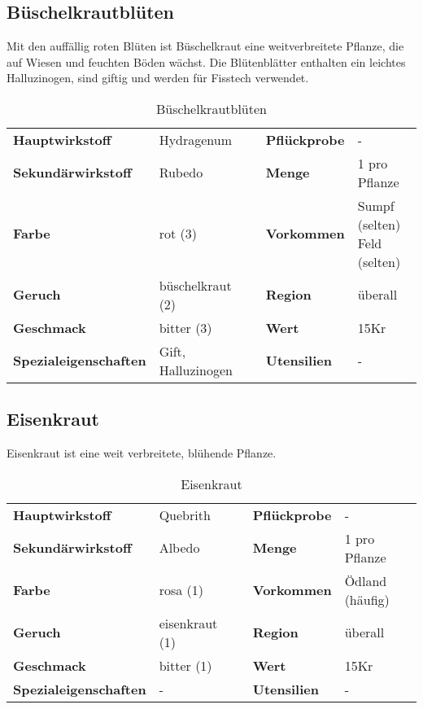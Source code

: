 \subsection{Büschelkrautblüten}
Mit den auffällig roten Blüten ist Büschelkraut eine weitverbreitete Pflanze, die auf Wiesen und feuchten Böden wächst. Die Blütenblätter enthalten ein leichtes Halluzinogen, sind giftig und werden für Fisstech verwendet. 

\begin{table}[H] 
\begin{center} 
\begin{tabular}{|l|l|p{1cm}|l|l|} 
  	\cline{1-2} \cline{4-5} 
  	\textbf{Hauptwirkstoff} & Hydragenum && \textbf{Pflückprobe} & - \\ \cline{1-2} \cline{4-5} 
  	\textbf{Sekundärwirkstoff} & Rubedo && \textbf{Menge} & 1 pro Pflanze \\ \cline{1-2} \cline{4-5} 
  	\textbf{Farbe} & rot (3) && \textbf{Vorkommen} & \brcell{Sumpf (selten)\\Feld (selten)} \\ \cline{1-2} \cline{4-5} 
  	\textbf{Geruch} & büschelkraut (2) && \textbf{Region} & überall \\ \cline{1-2} \cline{4-5} 
  	\textbf{Geschmack} & bitter (3) && \textbf{Wert} & 15Kr \\ \cline{1-2} \cline{4-5} 
  	\textbf{Spezialeigenschaften} & Gift, Halluzinogen && \textbf{Utensilien} & - \\ \cline{1-2} \cline{4-5} 
\end{tabular} 
\end{center} 
\caption{Büschelkrautblüten} 
\label{tab:bueschelkrautblueten} 
\end{table}


\subsection{Eisenkraut}
Eisenkraut ist eine weit verbreitete, blühende Pflanze. 

\begin{table}[H] 
\begin{center} 
\begin{tabular}{|l|l|p{1cm}|l|l|} 
  	\cline{1-2} \cline{4-5} 
  	\textbf{Hauptwirkstoff} & Quebrith && \textbf{Pflückprobe} & - \\ \cline{1-2} \cline{4-5} 
  	\textbf{Sekundärwirkstoff} & Albedo && \textbf{Menge} & 1 pro Pflanze \\ \cline{1-2} \cline{4-5} 
  	\textbf{Farbe} & rosa (1) && \textbf{Vorkommen} & Ödland (häufig) \\ \cline{1-2} \cline{4-5} 
  	\textbf{Geruch} & eisenkraut (1) && \textbf{Region} & überall \\ \cline{1-2} \cline{4-5} 
  	\textbf{Geschmack} & bitter (1) && \textbf{Wert} & 15Kr \\ \cline{1-2} \cline{4-5} 
  	\textbf{Spezialeigenschaften} & - && \textbf{Utensilien} & - \\ \cline{1-2} \cline{4-5} 
\end{tabular} 
\end{center} 
\caption{Eisenkraut} 
\label{tab:eisenkraut} 
\end{table}


